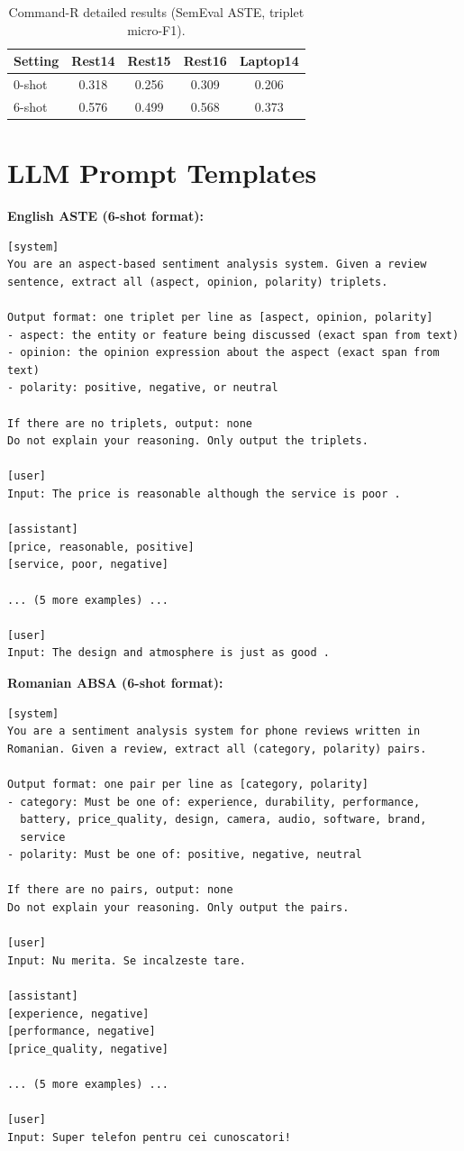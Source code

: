 \documentclass[12pt,a4paper]{report}
\begin{document}
\begin{table}[H]
\centering
\caption{Command-R detailed results (SemEval ASTE, triplet micro-F1).}
\small
\begin{tabular}{@{}lcccc@{}}
\toprule
\textbf{Setting} & \textbf{Rest14} & \textbf{Rest15} & \textbf{Rest16} & \textbf{Laptop14} \\
\midrule
0-shot & 0.318 & 0.256 & 0.309 & 0.206 \\
6-shot & 0.576 & 0.499 & 0.568 & 0.373 \\
\bottomrule
\end{tabular}
\end{table}


\section{LLM Prompt Templates}

\textbf{English ASTE (6-shot format):}
\begin{lstlisting}
[system]
You are an aspect-based sentiment analysis system. Given a review
sentence, extract all (aspect, opinion, polarity) triplets.

Output format: one triplet per line as [aspect, opinion, polarity]
- aspect: the entity or feature being discussed (exact span from text)
- opinion: the opinion expression about the aspect (exact span from text)
- polarity: positive, negative, or neutral

If there are no triplets, output: none
Do not explain your reasoning. Only output the triplets.

[user]
Input: The price is reasonable although the service is poor .

[assistant]
[price, reasonable, positive]
[service, poor, negative]

... (5 more examples) ...

[user]
Input: The design and atmosphere is just as good .
\end{lstlisting}

\textbf{Romanian ABSA (6-shot format):}
\begin{lstlisting}
[system]
You are a sentiment analysis system for phone reviews written in
Romanian. Given a review, extract all (category, polarity) pairs.

Output format: one pair per line as [category, polarity]
- category: Must be one of: experience, durability, performance,
  battery, price_quality, design, camera, audio, software, brand,
  service
- polarity: Must be one of: positive, negative, neutral

If there are no pairs, output: none
Do not explain your reasoning. Only output the pairs.

[user]
Input: Nu merita. Se incalzeste tare.

[assistant]
[experience, negative]
[performance, negative]
[price_quality, negative]

... (5 more examples) ...

[user]
Input: Super telefon pentru cei cunoscatori!
\end{lstlisting}




\end{document}
